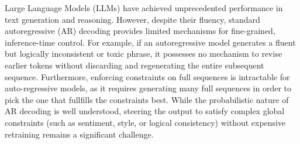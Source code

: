 \documentclass[11pt]{article}
\begin{document}



Large Language Models (LLMs) have achieved unprecedented performance in text generation and reasoning. However, despite their fluency, standard autoregressive (AR) decoding provides limited mechanisms for fine-grained, inference-time control. For example, if an autoregressive model generates a fluent but logically inconsistent or toxic phrase, it possesses no mechanism to revise earlier tokens without discarding and regenerating the entire subsequent sequence. Furthermore, enforcing constraints on full sequences is intractable for auto-regressive models, as it requires generating many full sequences in order to pick the one that fullfills the constraints best. While the probabilistic nature of AR decoding is well understood, steering the output to satisfy complex global constraints (such as sentiment, style, or logical consistency) without expensive retraining remains a significant challenge.
\end{document}
